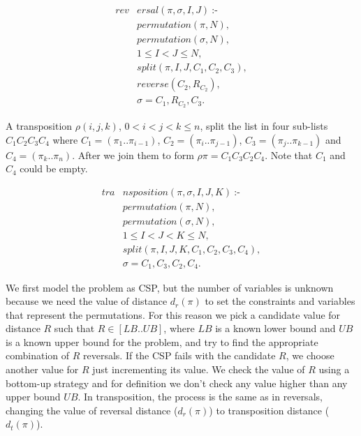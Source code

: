 \begin{align}
  \label{reversal}
  \textit{rev}&\textit{ersal}(\pi, \sigma, I, J)~\text{:-} \nonumber\\
  &\textit{permutation}(\pi, N), \nonumber\\
  &\textit{permutation}(\sigma, N), \nonumber \\
  &1 \le I < J \le N, \\
  &\textit{split}(\pi, I, J, C_{1}, C_{2}, C_{3}), \nonumber\\
  &\textit{reverse}(C_{2}, R_{C_{2}}), \nonumber \\
  &\sigma = C_{1}, R_{C_{2}}, C_{3}. \nonumber
\end{align}

A transposition $\rho(i,j,k)$, $0 < i < j < k\leq n$, split the list
in four sub-lists $C_{1}C_{2}C_{3}C_{4}$ where $C_{1} = (\pi_{1}
.. \pi_{i-1})$, $C_{2} = (\pi_{i} .. \pi_{j-1})$, $C_{3} = (\pi_{j}
.. \pi_{k-1})$ and $C_{4} = (\pi_{k} .. \pi_{n})$. After we join them
to form $\rho\pi = C_{1}C_{3}C_{2}C_{4}$. Note that $C_{1}$ and
$C_{4}$ could be empty.

\begin{align}
  \label{transposition}
  \textit{tra}&\textit{nsposition}(\pi, \sigma, I, J, K)~\text{:-} \nonumber\\
  &\textit{permutation}(\pi, N), \nonumber\\
  &\textit{permutation}(\sigma, N), \\
  &1 \le I < J < K \le N, \nonumber \\
  &\textit{split}(\pi, I, J, K, C_{1}, C_{2}, C_{3}, C_{4}), \nonumber\\
  &\sigma = C_{1}, C_{3}, C_{2}, C_{4}. \nonumber
\end{align}

We first model the problem as CSP, but the number of variables is
unknown because we need the value of distance $d_{r}(\pi)$ to set the
constraints and variables that represent the permutations. For this
reason we pick a candidate value for distance $R$ such that $R \in [LB
.. UB]$, where $LB$ is a known lower bound and $UB$ is a known upper
bound for the problem, and try to find the appropriate combination of
$R$ reversals. If the CSP fails with the candidate $R$, we choose
another value for $R$ just incrementing its value. We check the value
of $R$ using a bottom-up strategy and for definition we don't check
any value higher than any upper bound $UB$. In transposition, the
process is the same as in reversals, changing the value of reversal
distance ($d_{r}(\pi)$) to transposition distance ($d_{t}(\pi)$).

